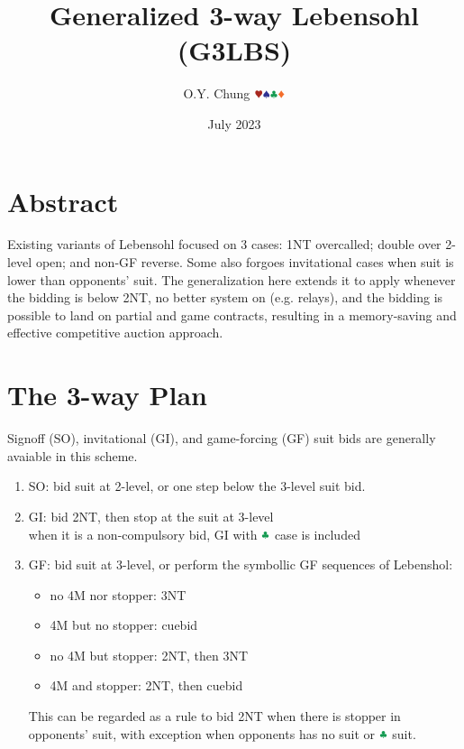 \documentclass{article}
\title{Generalized 3-way Lebensohl (G3LBS)}
\author{O.Y. Chung $\hhh\sss\ccc\ddd$}
\date{July 2023}
\newcommand*{\ccc}{\textcolor{ForestGreen}{\clubsuit}}
\begin{document}
\begin{CJK*}{UTF8}{gbsn}
\end{CJK*}
\maketitle

\begin{multicols}{2}

\section{Abstract}
Existing variants of Lebensohl focused on 3 cases: 1NT overcalled; double over 2-level open; and non-GF reverse. Some also forgoes invitational cases when suit is lower than opponents' suit. The generalization here extends it to apply whenever the bidding is below 2NT, no better system on (e.g. relays), and the bidding is possible to land on partial and game contracts, resulting in a memory-saving and effective competitive auction approach.

\section{The 3-way Plan}
Signoff (SO), invitational (GI), and game-forcing (GF) suit bids are generally avaiable in this scheme.

\begin{enumerate}
    \setlength\itemsep{-0.2em}
    \item SO: bid suit at 2-level, or one step below the 3-level suit bid.
    \item GI: bid 2NT, then stop at the suit at 3-level \\
    when it is a non-compulsory bid, GI with $\ccc$ case is included
    \item GF: bid suit at 3-level, or perform the symbollic GF sequences of Lebenshol:
    \begin{itemize}
        \setlength\itemsep{-0.2em}
        \item no 4M nor stopper: 3NT
        \item 4M but no stopper: cuebid
        \item no 4M but stopper: 2NT, then 3NT
        \item 4M and stopper: 2NT, then cuebid
    \end{itemize}
    This can be regarded as a rule to bid 2NT when there is stopper in opponents' suit, with exception when opponents has no suit or $\ccc$ suit.
\end{enumerate}


\end{multicols}
\end{document}
